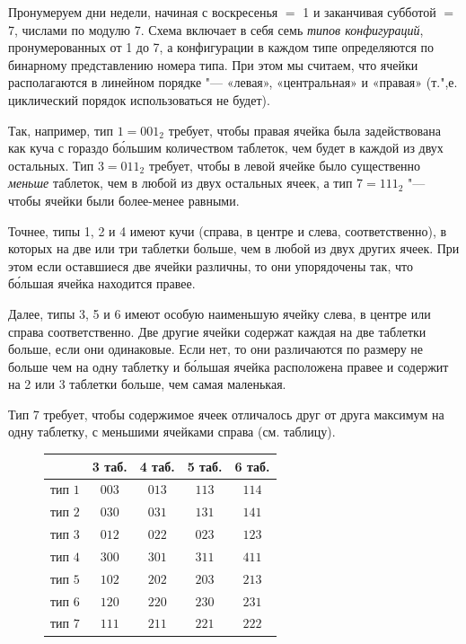 \documentclass[twoside]{book}
\begin{document}
Пронумеруем дни недели, начиная с воскресенья $=$ 1 и заканчивая субботой $=$ 7, числами по модулю 7.
Схема включает в себя семь \emph{типов конфигураций}, пронумерованных от 1 до 7, а конфигурации в каждом типе определяются по бинарному представлению номера типа.
При этом мы считаем, что ячейки располагаются в линейном порядке "--- «левая», «центральная» и «правая» (т.",е. циклический порядок использоваться не будет).

Так, например, тип $1=001_2$ требует, чтобы правая ячейка была задействована как куча с гораздо б\'{о}льшим количеством таблеток, чем будет в каждой из двух остальных.
Тип $3 = 011_2$ требует, чтобы в левой ячейке было существенно \emph{меньше} таблеток, чем в любой из двух остальных ячеек,
а тип 7$ = 111_2$ "--- чтобы ячейки были более-менее равными.

Точнее, типы 1, 2 и 4 имеют кучи (справа, в центре и слева, соответственно), в которых на две или три таблетки больше, чем в любой из двух других ячеек.
При этом если оставшиеся две ячейки различны, то они упорядочены так, что б\'{о}льшая ячейка находится правее.

Далее, типы 3, 5 и 6 имеют особую наименьшую ячейку слева, в центре или справа соответственно.
Две другие ячейки содержат каждая на две таблетки больше, если они одинаковые.
Если нет, то они различаются по размеру не больше чем на одну таблетку и б\'{о}льшая ячейка расположена правее и содержит на 2 или 3 таблетки больше, чем самая маленькая.

Тип 7 требует, чтобы содержимое ячеек отличалось друг от друга максимум на одну таблетку, с меньшими ячейками справа (см. таблицу).

\begin{figure}[!ht]
\centering
\begin{tabular}{ l  c c c c }
  \toprule
     & 3 таб. & 4 таб. & 5 таб. & 6 таб. \\ \midrule
    тип $1$ & $003$ & $013$ & $113$ & $114$ \\ 
    тип $2$ & $030$ & $031$ & $131$ & $141$ \\ 
    тип $3$ & $012$ & $022$ & $023$ & $123$\\ 
    тип $4$ & $300$ & $301$ & $311$ & $411$\\ 
    тип $5$ & $102$ & $202$ & $203$ & $213$\\ 
    тип $6$ & $120$ & $220$ & $230$ & $231$\\ 
  тип $7$ & $111$ & $211$ & $221$ & $222$ \\
                            \bottomrule
  \end{tabular}
\end{figure}
\end{document}
